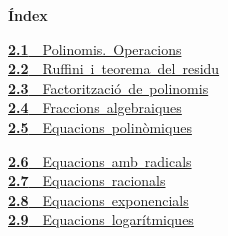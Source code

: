 \documentclass[11pt,a4paper]{article}
\begin{document}
\begin{tcolorbox}[colback=fmsurface,colframe=fmsurface,arc=3mm,left=4mm,right=4mm,top=2mm,bottom=2mm]
\small\textbf{Índex}\par\smallskip
\begin{minipage}[t]{0.49\linewidth}\small \mbox{\hyperlink{sec1}{\textbf{\color{fmgreen}2.1}\ \ Polinomis. Operacions}}\\[3pt]
\mbox{\hyperlink{sec2}{\textbf{\color{fmgreen}2.2}\ \ Ruffini i teorema del residu}}\\[3pt]
\mbox{\hyperlink{sec3}{\textbf{\color{fmgreen}2.3}\ \ Factorització de polinomis}}\\[3pt]
\mbox{\hyperlink{sec4}{\textbf{\color{fmgreen}2.4}\ \ Fraccions algebraiques}}\\[3pt]
\mbox{\hyperlink{sec5}{\textbf{\color{fmgreen}2.5}\ \ Equacions polinòmiques}}\\[3pt]\end{minipage}\hfill\begin{minipage}[t]{0.49\linewidth}\small \mbox{\hyperlink{sec6}{\textbf{\color{fmgreen}2.6}\ \ Equacions amb radicals}}\\[3pt]
\mbox{\hyperlink{sec7}{\textbf{\color{fmgreen}2.7}\ \ Equacions racionals}}\\[3pt]
\mbox{\hyperlink{sec8}{\textbf{\color{fmgreen}2.8}\ \ Equacions exponencials}}\\[3pt]
\mbox{\hyperlink{sec9}{\textbf{\color{fmgreen}2.9}\ \ Equacions logarítmiques}}\\[3pt]\end{minipage}
\end{tcolorbox}

\Needspace{5.7cm}
\end{document}
